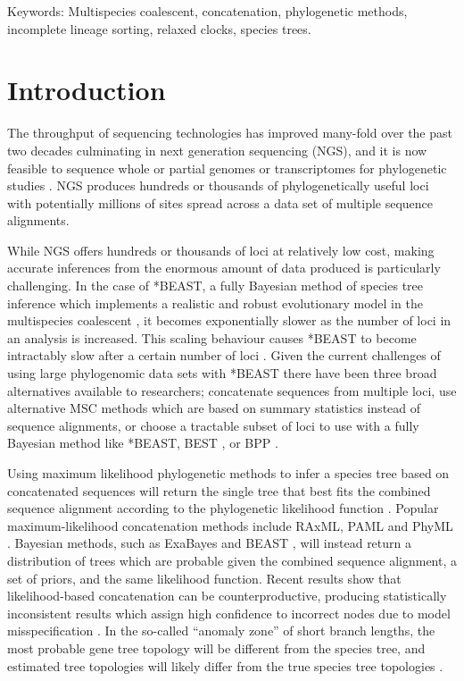 \documentclass[12pt]{article}
\begin{document}
Keywords: Multispecies coalescent, concatenation, phylogenetic methods, incomplete lineage sorting, relaxed clocks, species trees.

\section{Introduction}

The throughput of sequencing technologies has improved many-fold over the past
two decades culminating in next generation sequencing (NGS), and it is now
feasible to sequence whole or partial genomes or transcriptomes for phylogenetic
studies \citep{annurev-ecolsys-110512-135822}. NGS produces hundreds or
thousands of phylogenetically useful loci \citep[see for example][]{Blom20160181}
with potentially millions of sites spread across a data set of multiple
sequence alignments.

While NGS offers hundreds or thousands of loci at relatively low cost, making
accurate inferences from the enormous amount of data produced is particularly
challenging. In the case of *BEAST, a fully Bayesian method of species tree
inference which implements a realistic and robust evolutionary model in the
multispecies coalescent \citep[MSC;][]{Degnan2009332, Heled01032010}, it becomes exponentially
slower as the number of loci in an analysis is increased. This scaling behaviour
causes *BEAST to become intractably slow after a certain number of loci
\citep[the exact number will depend on other parameters of the data set, see][]{Ogilvie01052016}.
Given the current challenges of using large phylogenomic data sets with *BEAST
there have been three broad alternatives available to researchers; concatenate
sequences from multiple loci, use alternative MSC methods which are based on
summary statistics instead of sequence alignments, or choose a tractable
subset of loci to use with a fully Bayesian method like *BEAST, BEST \citep{Liu01112008}, or BPP
\citep{Yang854}.

Using maximum likelihood phylogenetic methods to infer a species tree based on concatenated
sequences will return the single tree that
best fits the combined sequence alignment according to the phylogenetic likelihood function \citep{Felsenstein1981}. Popular maximum-likelihood concatenation methods include
RAxML, PAML and PhyML \citep{Stamatakis01052014,
Yang01082007,Guindon01052010}. Bayesian methods, such as ExaBayes and BEAST
\citep{Aberer01102014, Drummond2007}, will instead return a distribution of trees which are probable
given the combined sequence alignment, a set of priors, and the same likelihood function.
Recent results show that likelihood-based concatenation
can be counterproductive, producing statistically inconsistent results which assign
high confidence to incorrect nodes due to model misspecification
\citep{NYAS:NYAS12747}. In the so-called ``anomaly zone'' of short branch
lengths, the most probable gene tree topology will be different from the species
tree, and estimated tree topologies will likely differ from the true species
tree topologies \citep{journal.pgen.0020068, Kubatko01022007}.
\end{document}
